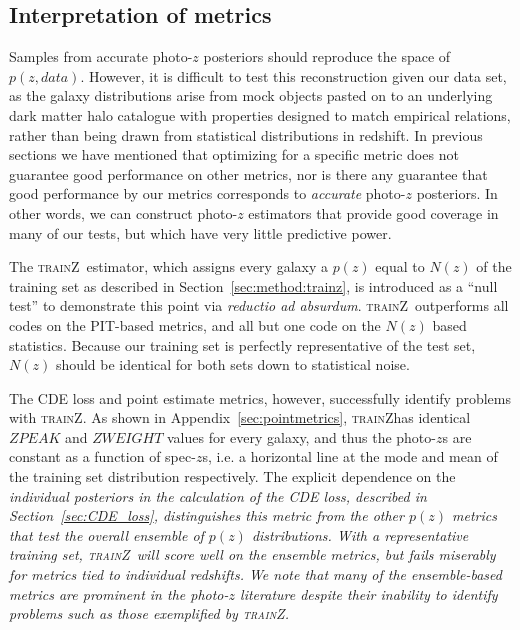 \documentclass[usenatbib]{mn2e}
\newcommand{\trainz}{\textsc{trainZ}}
\newcommand{\aim}[1]{\textcolor{green}{#1}}%
\begin{document}
\subsection{Interpretation of metrics}\label{sec:caution}

Samples from accurate photo-$z$ posteriors should reproduce the space of $p(z, data)$. However, it is difficult to test this reconstruction given our data set, as the galaxy distributions arise from mock objects pasted on to an underlying dark matter halo catalogue with properties designed to match empirical relations, rather than being drawn from statistical distributions in redshift.  In previous sections we have mentioned that optimizing for a specific metric does not guarantee good performance on other metrics, nor is there any guarantee that good performance by our metrics corresponds to \textit{accurate} photo-$z$ posteriors.  
In other words, we can construct photo-$z$ estimators that provide good coverage in many of our tests, but which have very little predictive power.  


The \trainz\ estimator, which assigns every galaxy a $p(z)$ equal to $N(z)$ of the training set as described in Section~\ref{sec:method:trainz}, is introduced as a ``null test'' to demonstrate this point via \textit{reductio ad absurdum}.  
\trainz\ outperforms all codes on the PIT-based metrics, and all but one code on the $N(z)$ based statistics.  
Because our training set is perfectly representative of the test set, $N(z)$ should be identical for both sets down to statistical noise.

The CDE loss and point estimate metrics, however, successfully identify problems with \trainz.  
As shown in Appendix~\ref{sec:pointmetrics}, \trainz has identical $ZPEAK$ and $ZWEIGHT$ values for every galaxy, and thus the photo-$z$s are constant as a function of spec-$z$s, i.e. a horizontal line at the mode and mean of the training set distribution respectively.  The explicit dependence on the \it{individual} posteriors in the calculation of the CDE loss, described in Section~\ref{sec:CDE_loss}, distinguishes this metric from the other $p(z)$ metrics that test the overall ensemble of $p(z)$ distributions.  With a representative training set, \trainz\ will score well on the ensemble metrics, but fails miserably for metrics tied to individual redshifts.  We note that many of the ensemble-based metrics are prominent in the photo-$z$ literature despite their inability to identify problems such as those exemplified by \trainz.
\end{document}
